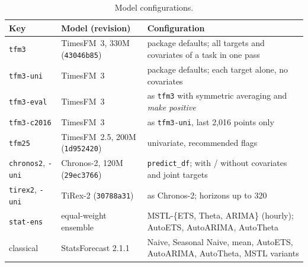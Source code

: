 \begin{table}[!htbp]
\centering
\caption{Model configurations.}
\label{tab:models}
\scriptsize
\begin{tabular}{llp{7.6cm}}
\toprule
Key & Model (revision) & Configuration \\
\midrule
\texttt{tfm3} & TimesFM~3, 330M (\texttt{43046b85}) & package defaults; all targets and covariates of a task in one pass \\
\texttt{tfm3-uni} & TimesFM~3 & package defaults; each target alone, no covariates \\
\texttt{tfm3-eval} & TimesFM~3 & as \texttt{tfm3} with symmetric averaging and \emph{make positive} \\
\texttt{tfm3-c2016} & TimesFM~3 & as \texttt{tfm3-uni}, last 2{,}016 points only \\
\texttt{tfm25} & TimesFM~2.5, 200M (\texttt{1d952420}) & univariate, recommended flags \\
\texttt{chronos2}, \texttt{-uni} & Chronos-2, 120M (\texttt{29ec3766}) & \texttt{predict\_df}; with / without covariates and joint targets \\
\texttt{tirex2}, \texttt{-uni} & TiRex-2 (\texttt{30788a31}) & as Chronos-2; horizons up to 320 \\
\texttt{stat-ens} & equal-weight ensemble & MSTL-\{ETS, Theta, ARIMA\} (hourly); AutoETS, AutoARIMA, AutoTheta \\
classical & StatsForecast 2.1.1 & Naive, Seasonal Naive, mean, AutoETS, AutoARIMA, AutoTheta, MSTL variants \\
\bottomrule
\end{tabular}
\end{table}
